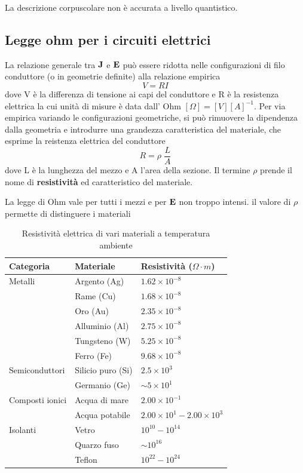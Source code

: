 La descrizione corpuscolare non \`e accurata a livello quantistico.
\subsection{Legge ohm per i circuiti elettrici}

La relazione generale tra $\bold{J}$ e $\bold{E}$ pu\`o essere ridotta nelle configurazioni di filo conduttore (o in geometrie definite) alla relazione empirica
\begin{equation}
	V = RI
\end{equation}
dove V \`e la differenza di tensione ai capi del conduttore e R \`e la resistenza elettrica  la cui unit\`a di misure \`e data dall' Ohm $[\Omega] = [V][A]^{-1}$. Per via empirica variando le configurazioni geometriche, si pu\`o rimuovere la dipendenza dalla geometria e introdurre una grandezza caratteristica del materiale, che esprime la reistenza elettrica del conduttore
\begin{equation*}
	R = \rho \; \frac{L}{A}
\end{equation*}
dove L \`e la lunghezza del mezzo e A l'area della sezione. Il termine $\rho$ prende il nome di \textbf{resistivit\`a} ed caratteristico del materiale.


La legge di Ohm vale per tutti i mezzi e per $\bold{E}$ non troppo intensi. il valore di $\rho$ permette di distinguere i materiali

\begin{table}[!ht]
\centering
\begin{tabular}{|l|l|l|}
\hline
\textbf{Categoria} & \textbf{Materiale} & \textbf{Resistivit\`a ($ \Omega \cdot m$)} \\
\hline
{Metalli} 
& Argento (Ag) & $1.62 \times 10^{-8}$ \\
& Rame (Cu) & $1.68 \times 10^{-8}$ \\
& Oro (Au) & $2.35 \times 10^{-8}$ \\
& Alluminio (Al) & $2.75 \times 10^{-8}$ \\
& Tungsteno (W) & $5.25 \times 10^{-8}$ \\
& Ferro (Fe) & $9.68 \times 10^{-8}$ \\
\hline
{Semiconduttori} 
& Silicio puro (Si) & $2.5 \times 10^{3}$ \\
& Germanio (Ge) & $\sim 5 \times 10^{1}$ \\
\hline
{Composti ionici} 
& Acqua di mare & $2.00 \times 10^{-1}$ \\
& Acqua potabile & $2.00 \times 10^{1} - 2.00 \times 10^{3}$ \\
\hline
{Isolanti} 
& Vetro & $10^{10} -10^{14}$ \\
& Quarzo fuso & $\sim 10^{16}$ \\
& Teflon & $10^{22}-10^{24}$ \\
\hline
\end{tabular}
\caption{Resistivit\`a elettrica di vari materiali a temperatura ambiente}
\end{table}

